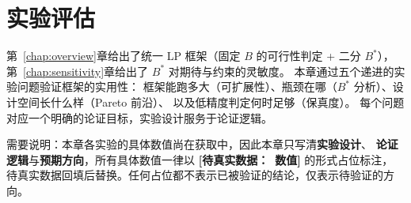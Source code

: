 \providecommand{\todo}[1]{\textbf{[待真实数据：\ #1]}}%

\chapter{实验评估}\label{chap:experiments}

第~\ref{chap:overview}章给出了统一 LP 框架（固定 $B$ 的可行性判定 + 二分 $B^*$），
第~\ref{chap:sensitivity}章给出了 $B^*$ 对期待与约束的灵敏度。
本章通过五个递进的实验问题验证框架的实用性：
框架能跑多大（可扩展性）、瓶颈在哪（$B^*$ 分析）、设计空间长什么样（Pareto 前沿）、
以及低精度判定何时足够（保真度）。
每个问题对应一个明确的论证目标，实验设计服务于论证逻辑。

需要说明：本章各实验的具体数值尚在获取中，因此本章只写清\textbf{实验设计}、
\textbf{论证逻辑}与\textbf{预期方向}，所有具体数值一律以 \todo{数值} 的形式占位标注，
待真实数据回填后替换。任何占位都不表示已被验证的结论，仅表示待验证的方向。






